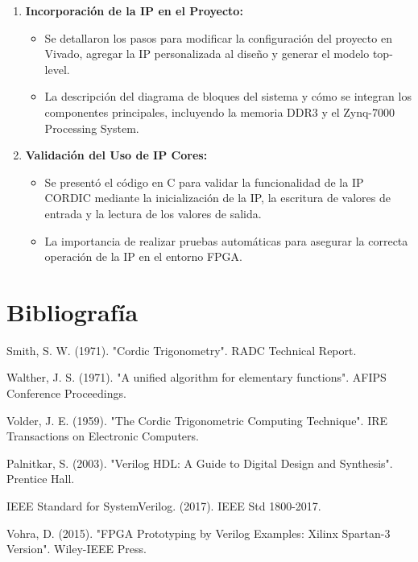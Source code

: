 \documentclass[12pt,a4paper, twoside]{article} %
\begin{document}
\begin{enumerate}
    \item \textbf{Incorporación de la IP en el Proyecto:}
    \begin{itemize}
        \item Se detallaron los pasos para modificar la configuración del proyecto en Vivado, agregar la IP personalizada al diseño y generar el modelo top-level.
        \item La descripción del diagrama de bloques del sistema y cómo se integran los componentes principales, incluyendo la memoria DDR3 y el Zynq-7000 Processing System.
    \end{itemize}
    
    \item \textbf{Validación del Uso de IP Cores:}
    \begin{itemize}
        \item Se presentó el código en C para validar la funcionalidad de la IP CORDIC mediante la inicialización de la IP, la escritura de valores de entrada y la lectura de los valores de salida.
        \item La importancia de realizar pruebas automáticas para asegurar la correcta operación de la IP en el entorno FPGA.
    \end{itemize}
\end{enumerate}


\newpage
\section{Bibliografía}

\begin{thebibliography}{6}
Smith, S. W. (1971). "Cordic Trigonometry". RADC Technical Report.

Walther, J. S. (1971). "A unified algorithm for elementary functions". AFIPS Conference Proceedings.

Volder, J. E. (1959). "The Cordic Trigonometric Computing Technique". IRE Transactions on Electronic Computers.

Palnitkar, S. (2003). "Verilog HDL: A Guide to Digital Design and Synthesis". Prentice Hall.

IEEE Standard for SystemVerilog. (2017). IEEE Std 1800-2017.

Vohra, D. (2015). "FPGA Prototyping by Verilog Examples: Xilinx Spartan-3 Version". Wiley-IEEE Press.

\end{thebibliography}
\end{document}
